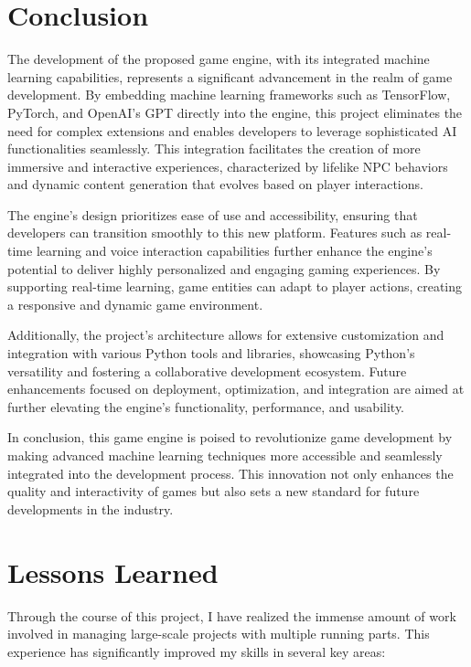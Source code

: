 





\section*{Conclusion}

The development of the proposed game engine, with its integrated machine learning capabilities, represents a significant advancement in the realm of game development. By embedding machine learning frameworks such as TensorFlow, PyTorch, and OpenAI's GPT directly into the engine, this project eliminates the need for complex extensions and enables developers to leverage sophisticated AI functionalities seamlessly. This integration facilitates the creation of more immersive and interactive experiences, characterized by lifelike NPC behaviors and dynamic content generation that evolves based on player interactions.

The engine's design prioritizes ease of use and accessibility, ensuring that developers can transition smoothly to this new platform. Features such as real-time learning and voice interaction capabilities further enhance the engine's potential to deliver highly personalized and engaging gaming experiences. By supporting real-time learning, game entities can adapt to player actions, creating a responsive and dynamic game environment.

Additionally, the project’s architecture allows for extensive customization and integration with various Python tools and libraries, showcasing Python's versatility and fostering a collaborative development ecosystem. Future enhancements focused on deployment, optimization, and integration are aimed at further elevating the engine's functionality, performance, and usability.

In conclusion, this game engine is poised to revolutionize game development by making advanced machine learning techniques more accessible and seamlessly integrated into the development process. This innovation not only enhances the quality and interactivity of games but also sets a new standard for future developments in the industry.

\section*{Lessons Learned}

Through the course of this project, I have realized the immense amount of work involved in managing large-scale projects with multiple running parts. This experience has significantly improved my skills in several key areas:

